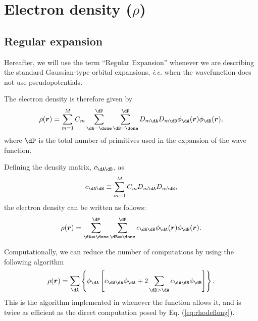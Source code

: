 \section{Electron density ($\rho$)}

\subsection{Regular expansion}

Hereafter, we will use the term ``Regular Expansion'' whenever we are describing
the standard Gaussian-type orbital expansions, \textit{i.e.} when the wavefunction
does not use pseudopotentials.

The electron density is therefore given by
%
\begin{equation}
   \rho(\boldsymbol{r})=\sum_{m=1}^{M}C_m\sum_{\dA=\done}^{\dP}\sum_{\dB=\done}^{\dP}D_{m\dA}D_{m\dB}
                        \phi_{\dA}(\boldsymbol{r})\phi_{\dB}(\boldsymbol{r}),
\end{equation}
%
where $\dP$ is the total number of primitives used in the expansion of the wave function.

Defining the density matrix, $c_{\dA\dB}$, as
%
\begin{equation}\label{eq:cabdefinition}
   c_{\dA\dB}\equiv\sum_{m=1}^{M}C_mD_{m\dA}D_{m\dB},
\end{equation}
%
the electron density can be written as follows:
%
\begin{equation}\label{eq:rhodeflong}
   \rho(\boldsymbol{r})=\sum_{\dA=\done}^{\dP}\sum_{\dB=\done}^{\dP}
      c_{\dA\dB}\phi_{\dA}(\boldsymbol{r})\phi_{\dB}(\boldsymbol{r}).
\end{equation}
%

Computationally, we can reduce the number of computations by using the following algorithm
%
\begin{equation}
   \rho(\boldsymbol{r})=\sum_{\dA}\left\{\phi_{\dA}\left[c_{\dA\dA}\phi_{\dA}+2\sum_{\dB>\dA}c_{\dA\dB}\phi_{\dB}\right]\right\}.
\end{equation}
%
This is the algorithm implemented in \DTK{} whenever the function allows it, and is twice as efficient as the direct computation posed by Eq. (\ref{eq:rhodeflong}).

